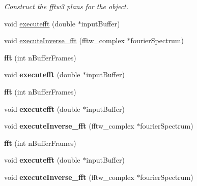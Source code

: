 \begin{DoxyCompactItemize}
\begin{DoxyCompactList}\small\item\em Construct the fftw3 plans for the object. \end{DoxyCompactList}\item 
void \hyperlink{classfft_a47e58fd4f715ad89a6fad8df9d715bf4}{executefft} (double $\ast$input\-Buffer)
\item 
void \hyperlink{classfft_a228bd861564c189cd7b6800c950a1c09}{execute\-Inverse\-\_\-fft} (fftw\-\_\-complex $\ast$fourier\-Spectrum)
\item 
\hypertarget{classfft_a5fff94ac07119207ddd05f628be5891d}{{\bfseries fft} (int n\-Buffer\-Frames)}\label{classfft_a5fff94ac07119207ddd05f628be5891d}

\item 
\hypertarget{classfft_a47e58fd4f715ad89a6fad8df9d715bf4}{void {\bfseries executefft} (double $\ast$input\-Buffer)}\label{classfft_a47e58fd4f715ad89a6fad8df9d715bf4}

\item 
\hypertarget{classfft_a5fff94ac07119207ddd05f628be5891d}{{\bfseries fft} (int n\-Buffer\-Frames)}\label{classfft_a5fff94ac07119207ddd05f628be5891d}

\item 
\hypertarget{classfft_a47e58fd4f715ad89a6fad8df9d715bf4}{void {\bfseries executefft} (double $\ast$input\-Buffer)}\label{classfft_a47e58fd4f715ad89a6fad8df9d715bf4}

\item 
\hypertarget{classfft_a228bd861564c189cd7b6800c950a1c09}{void {\bfseries execute\-Inverse\-\_\-fft} (fftw\-\_\-complex $\ast$fourier\-Spectrum)}\label{classfft_a228bd861564c189cd7b6800c950a1c09}

\item 
\hypertarget{classfft_a5fff94ac07119207ddd05f628be5891d}{{\bfseries fft} (int n\-Buffer\-Frames)}\label{classfft_a5fff94ac07119207ddd05f628be5891d}

\item 
\hypertarget{classfft_a47e58fd4f715ad89a6fad8df9d715bf4}{void {\bfseries executefft} (double $\ast$input\-Buffer)}\label{classfft_a47e58fd4f715ad89a6fad8df9d715bf4}

\item 
\hypertarget{classfft_a228bd861564c189cd7b6800c950a1c09}{void {\bfseries execute\-Inverse\-\_\-fft} (fftw\-\_\-complex $\ast$fourier\-Spectrum)}\label{classfft_a228bd861564c189cd7b6800c950a1c09}

\end{DoxyCompactItemize}
